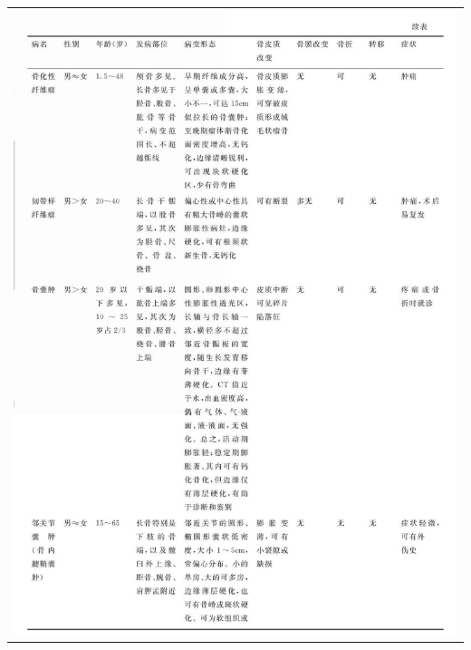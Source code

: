 \begin{longtable}{c}
\includegraphics[width=\textwidth,height=\textheight,keepaspectratio]{./images/Image00443.jpg}\\

\end{longtable}
